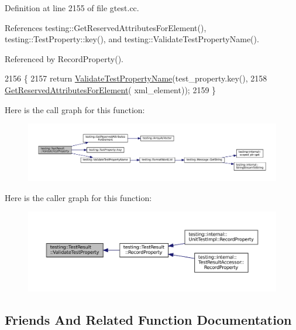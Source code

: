 Definition at line 2155 of file gtest.\+cc.



References testing\+::\+Get\+Reserved\+Attributes\+For\+Element(), testing\+::\+Test\+Property\+::key(), and testing\+::\+Validate\+Test\+Property\+Name().



Referenced by Record\+Property().


\begin{DoxyCode}
2156                                                                          \{
2157   \textcolor{keywordflow}{return} \hyperlink{namespacetesting_a4c9bd414747bf0563bfdb32a2307dcdf}{ValidateTestPropertyName}(test\_property.key(),
2158                                   \hyperlink{namespacetesting_acb3fdfadf475a3c2f5e22a3dae73532a}{GetReservedAttributesForElement}(
      xml\_element));
2159 \}
\end{DoxyCode}
Here is the call graph for this function\+:
\nopagebreak
\begin{figure}[H]
\begin{center}
\leavevmode
\includegraphics[width=350pt]{classtesting_1_1TestResult_a818c06cd2bfc00d6c81b0cebca044cb1_cgraph}
\end{center}
\end{figure}
Here is the caller graph for this function\+:
\nopagebreak
\begin{figure}[H]
\begin{center}
\leavevmode
\includegraphics[width=350pt]{classtesting_1_1TestResult_a818c06cd2bfc00d6c81b0cebca044cb1_icgraph}
\end{center}
\end{figure}


\subsection{Friends And Related Function Documentation}
\mbox{\label{classtesting_1_1TestResult_abae39633da9932847b41cb80efd62115}} 
